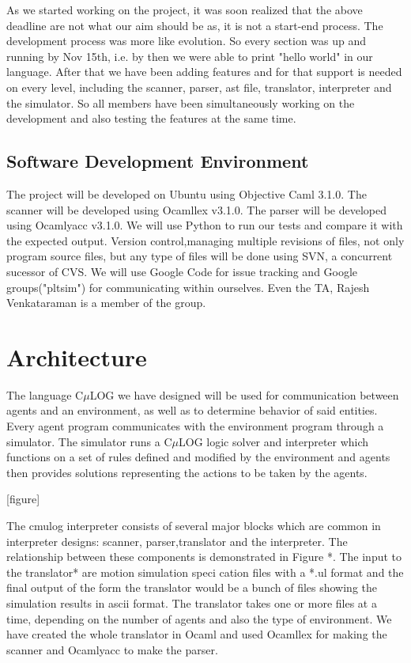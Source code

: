 \documentclass[onecolumn,titlepage]{article}
\begin{document}
As we started working on the project, it was soon realized that the
above deadline are not what our aim should be as, it is not a
start-end process. The development process was more like evolution. So
every section was up and running by Nov 15th, i.e. by then we were
able to print "hello world" in our language. After that we have been
adding features and for that support is needed on every level,
including the scanner, parser, ast file, translator, interpreter and
the simulator. So all members have been simultaneously working on the
development and also testing the features at the same time.


\subsection{Software Development Environment}
The project will be developed on Ubuntu using Objective Caml
3.1.0. The scanner will be developed using Ocamllex v3.1.0. The parser
will be developed using Ocamlyacc v3.1.0. We will use Python to run
our tests and compare it with the expected output. Version
control,managing multiple revisions of files, not only program source
files, but any type of files will be done using SVN, a concurrent
sucessor of CVS. We will use Google Code for issue tracking and Google
groups("pltsim") for communicating within ourselves. Even the TA,
Rajesh Venkataraman is a member of the group.




\section{Architecture}

The language C$\mu$LOG we have designed will be used for communication
between agents and an environment, as well as to determine behavior of
said entities. Every agent program communicates with the environment
program through a simulator. The simulator runs a C$\mu$LOG logic
solver and interpreter which functions on a set of rules defined and
modified by the environment and agents then provides solutions
representing the actions to be taken by the agents.


[figure]

The cmulog interpreter consists of several major blocks which are
common in interpreter designs: scanner, parser,translator and the
interpreter. The relationship between these components is demonstrated
in Figure *. The input to the translator* are motion simulation speci
cation files with a *.ul format and the final output of the form the
translator would be a bunch of files showing the simulation results in
ascii format. The translator takes one or more files at a time,
depending on the number of agents and also the type of environment. We
have created the whole translator in Ocaml and used Ocamllex for
making the scanner and Ocamlyacc to make the parser.
\end{document}
